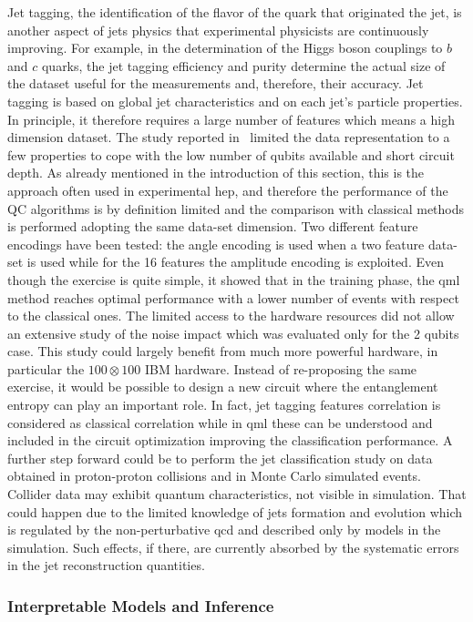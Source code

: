 Jet tagging, the identification of the flavor of the quark that originated the jet, is another aspect of jets physics that experimental physicists are continuously improving. For example, in the determination of the Higgs boson couplings to $b$ and $c$ quarks, the jet tagging efficiency and purity determine the actual size of the dataset useful for the measurements and, therefore, their accuracy. Jet tagging is based on global jet characteristics and on each jet's particle properties. In principle, it therefore requires a large number of features which means a high dimension dataset. 
The study reported in~\cite{btag} limited the data representation to a few properties to cope with the low number of qubits available and short circuit depth. As already mentioned in the introduction of this section, this is the approach often used in experimental \gls{hep}, and therefore the performance of the QC algorithms is by definition limited and the comparison with classical methods is performed adopting the same data-set dimension. 
Two different feature encodings have been tested: the angle encoding is used when a two feature data-set is used while for the 16 features the amplitude encoding is exploited.
Even though the exercise is quite simple, it showed that in the training phase, the \gls{qml} method reaches optimal performance with a lower number of events with respect to the classical ones. The limited access to the hardware resources did not allow an extensive study of the noise impact which was evaluated only for the 2 qubits case.
This study could largely benefit from much more powerful hardware, in particular the $100 \otimes 100$ IBM hardware.
Instead of re-proposing the same exercise, it would be possible to design a new circuit where the entanglement entropy can play an important role. In fact, jet tagging features correlation is considered as classical correlation while in \gls{qml} these can be understood and included in the circuit optimization improving the classification performance. 
A further step forward could be to perform the jet classification study on data obtained in proton-proton collisions and in Monte Carlo simulated events. Collider data may exhibit quantum characteristics,   not visible in simulation. That could happen due to the limited knowledge of jets formation and evolution which is regulated by the non-perturbative \gls{qcd} and described only by models in the simulation. Such effects, if there, are currently  absorbed by the systematic errors in the jet reconstruction quantities.


\subsubsection{Interpretable Models and Inference}
 
